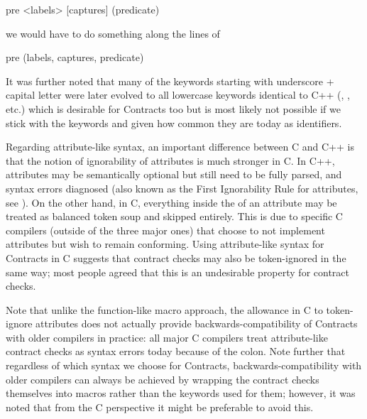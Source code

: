\begin{codeblock}
pre <labels> [captures] (predicate)
\end{codeblock}

we would have to do something along the lines of

\begin{codeblock}
pre (labels, captures, predicate)
\end{codeblock}

It was further noted that many of the keywords starting with underscore + capital letter were later evolved to all lowercase keywords identical to C++ (, , etc.) which is desirable for Contracts too but is most likely not possible if we stick with the keywords  and  given how common they are today as identifiers.

Regarding attribute-like syntax, an important difference between C and C++ is that the notion of ignorability of attributes is much stronger in C. In C++, attributes may be semantically optional but still need to be fully parsed, and syntax errors diagnosed (also known as the First Ignorability Rule for attributes, see \cite{P2552R3}). On the other hand, in C, everything inside the \tcode{[[...]]} of an attribute may be treated as balanced token soup and skipped entirely. This is due to specific C compilers (outside of the three major ones) that choose to not implement attributes but wish to remain conforming. Using attribute-like syntax for Contracts in C suggests that contract checks may also be token-ignored in the same way; most people agreed that this is an undesirable property for contract checks.

Note that unlike the function-like macro approach, the allowance in C to token-ignore attributes does not actually provide backwards-compatibility of Contracts with older compilers in practice: all major C compilers treat attribute-like contract checks as syntax errors today because of the colon. Note further that regardless of which syntax we choose for Contracts, backwards-compatibility with older compilers can always be achieved by wrapping the contract checks themselves into macros rather than the keywords used for them; however, it was noted that from the C perspective it might be preferable to avoid this.



